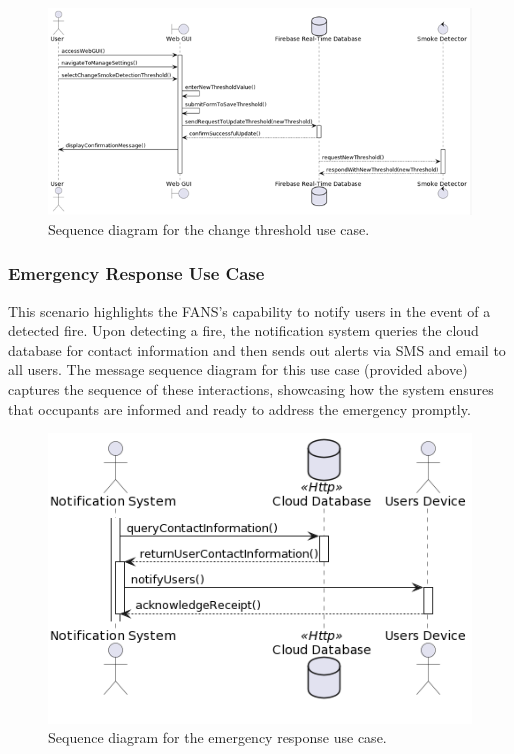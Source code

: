 \begin{figure}[H]
    \centering
    \includegraphics[width=\linewidth]{../assets/ChangingSmokeDetectionThresholdSequenceDiagram.png}
    \caption{Sequence diagram for the change threshold use case.}
\end{figure}

\subsubsection{Emergency Response Use Case}

This scenario highlights the FANS's capability to notify users in the event of a detected fire. Upon detecting a fire,
the notification system queries the cloud database for contact information and then sends out alerts via SMS and email
to all users. The message sequence diagram for this use case (provided above) captures the sequence of these
interactions, showcasing how the system ensures that occupants are informed and ready to address the emergency
promptly.

\begin{figure}[H]
    \centering
    \includegraphics[width=\linewidth]{../assets/UserNotificationSequenceDiagram.png}
    \caption{Sequence diagram for the emergency response use case.}
\end{figure}

